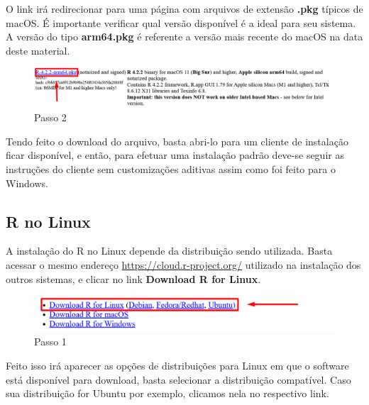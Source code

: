 \documentclass[
  letterpaper,
  DIV=11,
  numbers=noendperiod]{scrreprt}
\begin{document}
O link irá redirecionar para uma página com arquivos de extensão
\textbf{.pkg} típicos de macOS. É importante verificar qual versão
disponível é a ideal para seu sistema. A versão do tipo
\textbf{arm64.pkg} é referente a versão mais recente do macOS na data
deste material.

\begin{figure}

{\centering \includegraphics[width=1\textwidth,height=\textheight]{./figuras_tutorialR/mac_R_2.png}

}

\caption{Passo 2}

\end{figure}

Tendo feito o download do arquivo, basta abri-lo para um cliente de
instalação ficar disponível, e então, para efetuar uma instalação padrão
deve-se seguir as instruções do cliente sem customizações aditivas assim
como foi feito para o Windows.

\hypertarget{r-no-linux}{%
\subsection{R no Linux}\label{r-no-linux}}

A instalação do R no Linux depende da distribuição sendo utilizada.
Basta acessar o mesmo endereço \url{https://cloud.r-project.org/}
utilizado na instalação dos outros sistemas, e clicar no link
\textbf{Download R for Linux}.

\begin{figure}

{\centering \includegraphics[width=1\textwidth,height=\textheight]{./figuras_tutorialR/linux1.png}

}

\caption{Passo 1}

\end{figure}

Feito isso irá aparecer as opções de distribuições para Linux em que o
software está disponível para download, basta selecionar a distribuição
compatível. Caso sua distribuição for Ubuntu por exemplo, clicamos nela
no respectivo link.
\end{document}
